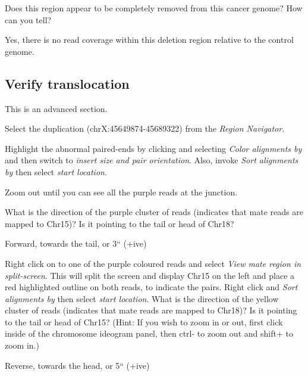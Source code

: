 \begin{questions}
Does this region appear to be completely removed from this cancer genome? How can you tell?
\begin{answer}
Yes, there is no read coverage within this deletion region relative to the control genome. 
\end{answer}
\end{questions}



\subsection{Verify translocation}
\begin{advanced}
This is an advanced section.
\begin{steps}
Select the duplication (chrX:45649874-45689322) from the \emph{Region Navigator}. 

Highlight the abnormal paired-ends by clicking and selecting \emph{Color alignments by} and then switch to \emph{insert size and pair orientation}. Also, invoke \emph{Sort alignments by} then select \emph{start location}.

Zoom out until you can see all the purple reads at the junction.
\end{steps}
\end{advanced}

\begin{questions}
What is the direction of the purple cluster of reads (indicates that mate reads are mapped to Chr15)? Is it pointing to the tail or head of Chr18? 
\begin{answer}
Forward, towards the tail, or 3`` (+ive)
\end{answer}
\end{questions}

\begin{questions}
Right click on to one of the purple coloured reads and select \emph{View mate region in split-screen}. This will split the screen and display Chr15 on the left and place a red highlighted outline on both reads, to indicate the pairs. Right click and \emph{Sort alignments by} then select \emph{start location}.
What is the direction of the yellow cluster of reads (indicates that mate reads are mapped to Chr18)? Is it pointing to the tail or head of Chr15? \newline
(Hint: If you wish to zoom in or out, first click inside of the chromosome ideogram panel, then ctrl- to zoom out and shift+ to zoom in.) 
\begin{answer}
Reverse, towards the head, or 5`` (+ive)
\end{answer}
\end{questions}

